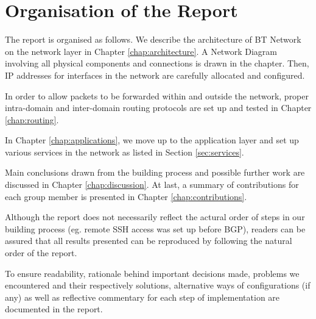 \section{Organisation of the Report}
\label{sec:organisation}

The report is organised as follows. We describe the architecture of BT Network on the network layer in Chapter \ref{chap:architecture}. A Network Diagram involving all physical components and connections is drawn in the chapter. Then, IP addresses for interfaces in the network are carefully allocated and configured. 

In order to allow packets to be forwarded within and outside the network, proper intra-domain and inter-domain routing protocols are set up and tested in Chapter \ref{chap:routing}. 

In Chapter \ref{chap:applications}, we move up to the application layer and set up various services in the network as listed in Section \ref{sec:services}.

Main conclusions drawn from the building process and possible further work are discussed in Chapter \ref{chap:discussion}. At last, a summary of contributions for each group member is presented in Chapter \ref{chap:contributions}.

Although the report does not necessarily reflect the actural order of steps in our building process (eg. remote SSH access was set up before BGP), readers can be assured that all results presented can be reproduced by following the natural order of the report.

To ensure readability, rationale behind important decisions made, problems we encountered and their respectively solutions, alternative ways of configurations (if any) as well as reflective commentary for each step of implementation are documented in the report.
